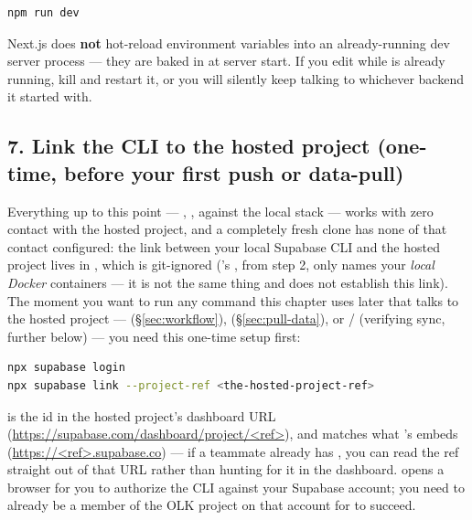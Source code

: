 \begin{lstlisting}[style=olkcodebash, language=bash, caption={Standard Next.js dev server}]
npm run dev
\end{lstlisting}

\begin{olkwarn}
Next.js does \textbf{not} hot-reload  environment variables into an already-running dev server process — they are baked in at server start. If you edit  while  is already running, kill and restart it, or you will silently keep talking to whichever backend it started with.
\end{olkwarn}

\subsection{7. Link the CLI to the hosted project (one-time, before your first push or data-pull)}
\label{sec:link}

Everything up to this point — , ,  against the local stack — works with zero contact with the hosted project, and a completely fresh clone has none of that contact configured: the link between your local Supabase CLI and the hosted project lives in , which is git-ignored ('s , from step 2, only names your \emph{local Docker} containers — it is not the same thing and does not establish this link). The moment you want to run any command this chapter uses later that talks to the hosted project —  (\S\ref{sec:workflow}),  (\S\ref{sec:pull-data}), or / (verifying sync, further below) — you need this one-time setup first:

\begin{lstlisting}[style=olkcodebash, language=bash, caption={One-time per machine: authenticate, then link to the hosted OLK project}]
npx supabase login
npx supabase link --project-ref <the-hosted-project-ref>
\end{lstlisting}

\begin{olknote}
 is the id in the hosted project's dashboard URL (\url{https://supabase.com/dashboard/project/<ref>}), and matches what 's  embeds (\url{https://<ref>.supabase.co}) — if a teammate already has , you can read the ref straight out of that URL rather than hunting for it in the dashboard.  opens a browser for you to authorize the CLI against your Supabase account; you need to already be a member of the OLK project on that account for  to succeed.
\end{olknote}

